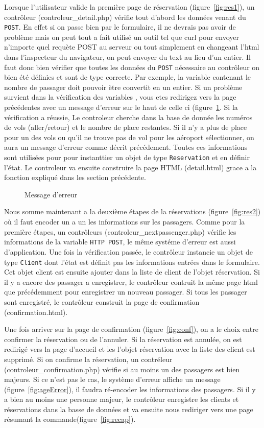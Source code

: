 \documentclass[12pt,a4paper]{article}
\begin{document}
			Lorsque l'utilisateur valide la première page de réservation (figure~\ref{fig:res1}), un contrôleur (controleur\_detail.php) vérifie tout d'abord les données venant du \texttt{POST}. En effet si on passe bien par le formulaire, il ne devrais pas avoir de problème mais on peut tout a fait utilisé un outil tel que curl pour envoyer n'importe quel requète POST au serveur ou tout simplement en changeant l'html dans l'inspecteur du navigateur, on peut envoyer du text au lieu d'un entier. Il faut donc bien vérifier que toutes les données du \texttt{POST} nécessaire au contrôleur on bien été définies et sont de type correcte. Par exemple, la variable contenant le nombre de passager doit pouvoir ètre convertit en un entier. Si un problème survient dans la vérification des variables , vous etes redirigez vers la page précédentes avec un message d'erreur sur le haut de celle ci (figure~\ref{fig:error}. Si la vérification a réussie, Le controleur cherche dans la base de donnée les numéros de vols (aller/retour) et le nombre de place restantes. Si il n'y a plus de place pour un des vols ou qu'il ne trouve pas de vol pour les aéroport sélectionner, on aura un message d'erreur comme décrit précédement. Toutes ces informations sont utilisées pour pour instanttier un objet de type \texttt{Reservation} et en définir l'état. Le controleur va ensuite construire la page HTML (detail.html) grace a la fonction expliqué dans les section précédente.
			\begin{figure}
				\caption{Message d'erreur}
				\label{fig:error}
			\end{figure}


			Nous somme maintenant a la deuxième étapes de la réservations (figure~\ref{fig:res2}) où il faut encoder un a un les informations sur les passagers. Comme pour la première étapes, un contrôleurs (controleur\_nextpassenger.php) vérifie les informations de la variable \texttt{HTTP POST}, le même systéme d'erreur est aussi d'application. Une fois la vérification passée, le contrôleur instancie un objet de type \texttt{Client} dont l'état est définit pas les informations entrées dans le formulaire. Cet objet client est ensuite ajouter dans la liste de client de l'objet réservation. Si il y a encore des passager a enregistrer, le contrôleur contruit la même page html que précédemment pour enregistrer un nouveau passager. Si tous les passager sont enregistré, le contrôleur construit la page de confirmation (confirmation.html).

			Une fois arriver sur la page de confirmation (figure~\ref{fig:conf}), on a le choix entre confirmer la réservation ou de l'annuler. Si la réservation est annulée, on est redirigé vers la page d'accueil et les l'objet réservation avec la liste des client est supprimé. Si on confirme la réservation, un contréleur (controleur\_confirmation.php) vérifie si au moins un des passagers est bien majeurs. Si ce n'est pas le cas, le système d'erreur affiche un message (figure~\ref{fig:ageError}), il faudra ré-encoder les informations des passagers. Si il y a bien au moins une personne majeur, le contrôleur enregistre les clients et réservations dans la basse de données et va ensuite nous rediriger vers une page résumant la commande(figure~\ref{fig:recap}).
\end{document}
